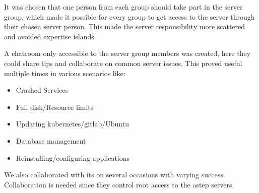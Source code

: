 \FloatBarrier
{}
It was chosen that one person from each group should take part in the server group, which made it possible for every group to get access to the server through their chosen server person. This made the server responsibility more scattered and avoided expertise islands.

A chatroom only accessible to the server group members was created, here they could share tips and collaborate on common server issues. This proved useful multiple times in various scenarios like:

\begin{itemize}
    \item Crashed Services
    \item Full disk/Resource limits
    \item Updating \gls{kubernetes}/\gls{gitlab}/Ubuntu
    \item Database management
    \item Reinstalling/configuring applications
\end{itemize}

\noindent
We also collaborated with \gls{its} on several occasions with varying success. Collaboration is needed since they control root access to the \gls{astep} servers. 
